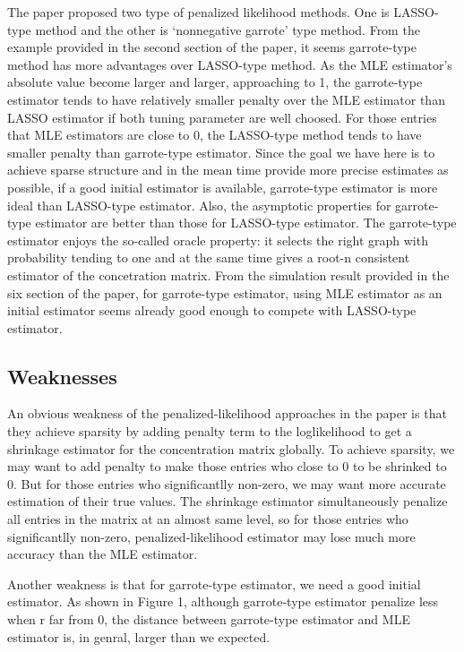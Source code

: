 The paper proposed two type of penalized likelihood methods.  One is LASSO-type method and the other is `nonnegative garrote' type method.  From the example provided in the second section of the paper, it seems garrote-type method has more advantages over LASSO-type method.  As the MLE estimator's absolute value become larger and larger, approaching to 1, the garrote-type estimator tends to have relatively smaller penalty over the MLE estimator than LASSO estimator if both tuning parameter are well choosed.  For those entries that MLE estimators are close to 0, the LASSO-type method tends to have smaller penalty than garrote-type estimator.  Since the goal we have here is to achieve sparse structure and in the mean time provide more precise estimates as possible, if a good initial estimator is available, garrote-type estimator is more ideal than LASSO-type estimator.  Also, the asymptotic properties for garrote-type estimator are better than those for LASSO-type estimator.  The garrote-type estimator enjoys the so-called oracle property: it selects the right graph with probability tending to one and at the same time gives a root-n consistent estimator of the concetration matrix.  From the simulation result provided in the six section of the paper, for garrote-type estimator, using MLE estimator as an initial estimator seems already good enough to compete with LASSO-type estimator.


\subsection*{Weaknesses}

An obvious weakness of the penalized-likelihood approaches in the paper is that they achieve sparsity by adding penalty term to the loglikelihood to get a shrinkage estimator for the concentration matrix globally.  To achieve sparsity, we may want to add penalty to make those entries who close to 0 to be shrinked to 0.  But for those entries who significantlly non-zero, we may want more accurate estimation of their true values.  The shrinkage estimator simultaneously penalize all entries in the matrix at an almost same level, so for those entries who significantlly non-zero, penalized-likelihood estimator may lose much more accuracy than the MLE estimator.

Another weakness is that for garrote-type estimator, we need a good initial estimator.  As shown in Figure 1, although garrote-type estimator penalize less when r far from 0, the distance between garrote-type estimator and MLE estimator is, in genral, larger than we expected.

